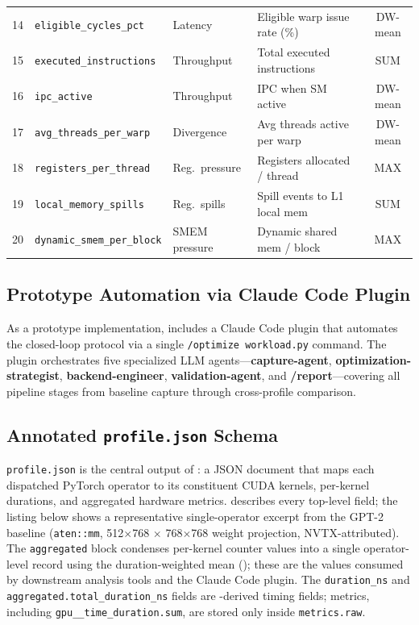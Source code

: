 \begin{table}[h]
\begin{tabular}{clllc}
14 & \texttt{eligible\_\allowbreak cycles\_pct}       & Latency          & Eligible warp issue rate (\%) & DW-mean \\
15 & \texttt{executed\_instructions}      & Throughput       & Total executed instructions  & SUM \\
16 & \texttt{ipc\_active}                 & Throughput       & IPC when SM active           & DW-mean \\
17 & \texttt{avg\_threads\_per\_warp}     & Divergence       & Avg threads active per warp  & DW-mean \\
18 & \texttt{registers\_per\_thread}      & Reg.\ pressure   & Registers allocated / thread & MAX \\
19 & \texttt{local\_memory\_spills}       & Reg.\ spills     & Spill events to L1 local mem & SUM \\
20 & \texttt{dynamic\_smem\_per\_block}   & SMEM pressure    & Dynamic shared mem / block   & MAX \\
\bottomrule
\end{tabular}
\end{table}

\subsection{Prototype Automation via Claude Code Plugin}
\label{sec:appendix:plugin}

As a prototype implementation, \sys includes a Claude Code plugin that automates the
closed-loop protocol via a single \texttt{/optimize workload.py} command.  The plugin orchestrates five
specialized LLM agents---\textbf{capture-agent}, \textbf{optimization-strategist},
\textbf{backend-engineer}, \textbf{validation-agent}, and \textbf{/report}---covering all
pipeline stages from baseline capture through cross-profile comparison. 


\subsection{Annotated \texttt{profile.json} Schema}
\label{sec:appendix:schema}

\texttt{profile.json} is the central output of \sys: a JSON document that maps each
dispatched PyTorch operator to its constituent CUDA kernels, per-kernel \nsys durations,
and aggregated hardware metrics.   describes every top-level field; the listing below
shows a representative single-operator excerpt from the GPT-2 baseline
(\texttt{aten::mm}, 512$\times$768 $\times$ 768$\times$768 weight projection, NVTX-attributed).
The \texttt{aggregated} block condenses per-kernel counter values into a single
operator-level record using the duration-weighted mean (); these are the
values consumed by downstream analysis tools and the Claude Code plugin.
The \texttt{duration\_ns} and \texttt{aggregated.total\_duration\_ns} fields are
\nsys-derived timing fields; \ncu metrics, including
\texttt{gpu\_\_time\_duration.sum}, are stored only inside \texttt{metrics.raw}.

